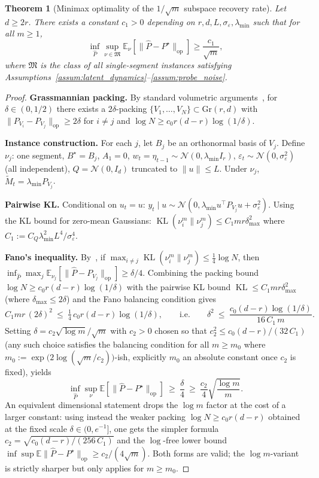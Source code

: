 \documentclass[11pt]{article}
\newcommand{\E}{\mathbb{E}}
\newcommand{\op}{\mathrm{op}}
\DeclareMathOperator{\KL}{KL}
\newtheorem{theorem}{Theorem}
\begin{document}
\begin{theorem}[Minimax optimality of the $1/\sqrt{m}$ subspace recovery rate]
\label{thm:minimax_subspace_recovery}
Let $d\ge 2r$.  There exists a constant $c_1>0$ depending on $r,d,L,\sigma_\varepsilon,
\lambda_{\min}$ such that for all $m\ge 1$,
\[
\inf_{\widehat{P}}\sup_{\nu\in\mathfrak{M}}
\E_\nu[\|\widehat{P}-P^\star\|_{\op}]
\ge\frac{c_1}{\sqrt{m}},
\]
where $\mathfrak{M}$ is the class of all single-segment instances satisfying
Assumptions~\ref{assum:latent_dynamics}--\ref{assum:probe_noise}.
\end{theorem}

\begin{proof}
\textbf{Grassmannian packing.}
By standard volumetric arguments~\citep{szarek1983finite}, for $\delta\in(0,1/2)$
there exists a $2\delta$-packing $\{V_1,\ldots,V_N\}\subset\mathrm{Gr}(r,d)$ with
$\|P_{V_i}-P_{V_j}\|_{\op}\ge 2\delta$ for $i\neq j$ and
$\log N\ge c_0 r(d{-}r)\log(1/\delta)$.

\textbf{Instance construction.}
For each $j$, let $B_j$ be an orthonormal basis of $V_j$.
Define $\nu_j$: one segment, $B^\star=B_j$, $A_1=0$,
$w_t=\eta_{t-1}\sim\mathcal{N}(0,\lambda_{\min}I_r)$,
$\varepsilon_t\sim\mathcal{N}(0,\sigma_\varepsilon^2)$ (all independent),
$Q=\mathcal{N}(0,I_d)$ truncated to $\|u\|\le L$.
Under $\nu_j$, $\widetilde{M}_t=\lambda_{\min}P_{V_j}$.

\textbf{Pairwise KL.}
Conditional on $u_t=u$: $y_t\mid u\sim\mathcal{N}(0,\lambda_{\min}u^\top P_{V_j}u
+\sigma_\varepsilon^2)$.
Using the KL bound for zero-mean Gaussians:
$\KL(\nu_i^m\|\nu_j^m)
\le C_1 mr\delta_{\max}^2$
where $C_1:=C_Q\lambda_{\min}^2 L^4/\sigma_\varepsilon^4$.

\textbf{Fano's inequality.}
By~\citet[Theorem~2.7]{tsybakov2009introduction}, if
$\max_{i\neq j}\KL(\nu_i^m\|\nu_j^m)\le\tfrac{1}{4}\log N$, then
$\inf_{\widehat{P}}\max_j\E_{\nu_j}[\|\widehat{P}-P_{V_j}\|_{\op}]\ge\delta/4$.
Combining the packing bound
$\log N\ge c_0 r(d{-}r)\log(1/\delta)$ with the pairwise KL bound
$\KL\le C_1 m r\delta_{\max}^2$ (where $\delta_{\max}\le 2\delta$) and
the Fano balancing condition gives
\[
  C_1 m r\,(2\delta)^2\ \le\ \tfrac{1}{4}\,c_0 r(d{-}r)\log(1/\delta),
  \qquad\text{i.e.}\qquad
  \delta^2\ \le\ \frac{c_0(d{-}r)\log(1/\delta)}{16\,C_1\,m}.
\]
Setting $\delta=c_2\sqrt{\log m}/\sqrt{m}$ with $c_2>0$ chosen so that
$c_2^2\le c_0(d{-}r)/(32\,C_1)$ (any such choice satisfies the balancing
condition for all $m\ge m_0$ where
$m_0:=\exp\bigl(2\log(\sqrt m/c_2)\bigr)$-ish, explicitly
$m_0$ an absolute constant once $c_2$ is fixed), yields
\[
  \inf_{\widehat{P}}\sup_\nu\E[\|\widehat{P}-P^\star\|_{\op}]
  \ \ge\ \frac{\delta}{4}
  \ \ge\ \frac{c_2}{4}\sqrt{\frac{\log m}{m}}.
\]
An equivalent dimensional statement drops the $\log m$ factor at the cost
of a larger constant: using instead the weaker packing
$\log N\ge c_0 r(d{-}r)$ obtained at the fixed scale
$\delta\in(0,e^{-1}]$, one gets the simpler formula
$c_2=\sqrt{c_0(d{-}r)/(256\,C_1)}$ and the $\log$-free lower bound
$\inf\sup\E\|\widehat P-P^\star\|_{\op}\ge c_2/(4\sqrt m)$.  Both forms
are valid; the $\log m$-variant is strictly sharper but only applies for
$m\ge m_0$.
\end{proof}
\end{document}
